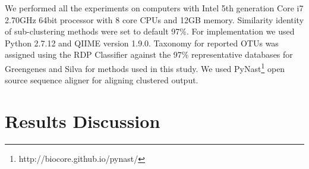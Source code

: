 \documentclass[10pt, conference, compsocconf]{IEEEtran}
\begin{document}
\begin{table}[htb] 
	\caption{\textbf{Parameter Settings}}
	\label{table:parameters}
\end{table}	     

We performed all the experiments on computers with Intel 5th generation Core i7 2.70GHz 64bit processor with 8 core CPUs and 12GB memory. Similarity identity of sub-clustering methods were set to default 97\%. For implementation we used Python 2.7.12 and QIIME \cite{MARQiime} version 1.9.0. Taxonomy for reported OTUs was assigned using the RDP Classifier \cite{MARRdp} against the 97\% representative databases for Greengenes \cite{MARGreen1} and Silva \cite{MARSilva} for methods used in this study. We used PyNast\footnote{http://biocore.github.io/pynast/} open source sequence aligner for aligning clustered output. 

\section{Results Discussion} 
\label{sec:Results}
\end{document}
